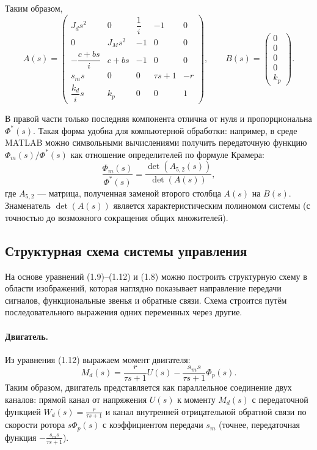 \documentclass[a4paper, 14pt]{extarticle}
\begin{document}
    Таким образом,
    \[
    A(s) = 
    \begin{pmatrix}
    J_d s^2 & 0 & \dfrac{1}{i} & -1 & 0 \\[4mm]
    0 & J_M s^2 & -1 & 0 & 0 \\[2mm]
    -\dfrac{c+bs}{i} & c+bs & -1 & 0 & 0 \\[2mm]
    s_m s & 0 & 0 & \tau s+1 & -r \\[2mm]
    \dfrac{k_d}{i}s & k_p & 0 & 0 & 1
    \end{pmatrix},
    \qquad
    B(s) = 
    \begin{pmatrix}
    0 \\ 0 \\ 0 \\ 0 \\ k_p
    \end{pmatrix}.
    \]

    В правой части только последняя компонента отлична от нуля и пропорциональна $\Phi^*(s)$. Такая форма удобна для компьютерной обработки: например, в среде MATLAB можно символьными вычислениями получить передаточную функцию $\Phi_m(s)/\Phi^*(s)$ как отношение определителей по формуле Крамера:
    \[
    \frac{\Phi_m(s)}{\Phi^*(s)} = \frac{\det(A_{5,2}(s))}{\det(A(s))},
    \]
    где $A_{5,2}$ — матрица, полученная заменой второго столбца $A(s)$ на $B(s)$. Знаменатель $\det(A(s))$ является характеристическим полиномом системы (с точностью до возможного сокращения общих множителей).

    \subsection{Структурная схема системы управления}
    На основе уравнений (1.9)–(1.12) и (1.8) можно построить структурную схему в области изображений, которая наглядно показывает направление передачи сигналов, функциональные звенья и обратные связи. Схема строится путём последовательного выражения одних переменных через другие.

    \paragraph{Двигатель.}
    Из уравнения (1.12) выражаем момент двигателя:
    \[
    M_d(s) = \frac{r}{\tau s+1} U(s) - \frac{s_m s}{\tau s+1} \Phi_p(s).
    \]
    Таким образом, двигатель представляется как параллельное соединение двух каналов: прямой канал от напряжения $U(s)$ к моменту $M_d(s)$ с передаточной функцией $W_d(s) = \frac{r}{\tau s+1}$ и канал внутренней отрицательной обратной связи по скорости ротора $s\Phi_p(s)$ с коэффициентом передачи $s_m$ (точнее, передаточная функция $-\frac{s_m s}{\tau s+1}$).
\end{document}
